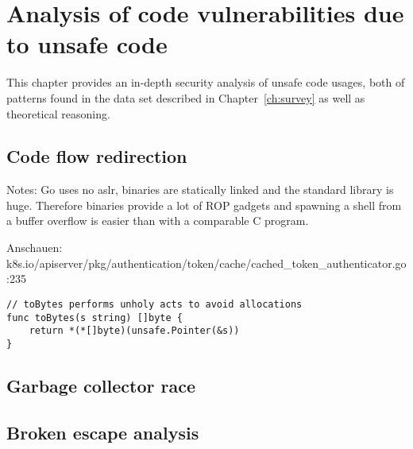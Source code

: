 
\chapter{Analysis of code vulnerabilities due to unsafe code}\label{ch:code-vulnerabilities}

This chapter provides an in-depth security analysis of unsafe code usages, both of patterns found in the data set
described in Chapter~\ref{ch:survey} as well as theoretical reasoning.



\section{Code flow redirection}\label{sec:vulnerability-flow-redirection}

Notes: Go uses no \acrshort{aslr}, binaries are statically linked and the standard library is huge.
Therefore binaries provide a lot of ROP gadgets and spawning a shell from a buffer overflow is easier than with a
comparable C program.

Anschauen: k8s.io/apiserver/pkg/authentication/token/cache/cached\_token\_authenticator.go:235

\begin{lstlisting}[language=Golang, label=lst:todo-unsafe-snippet, caption=Todo: unsafe code snippet?]
// toBytes performs unholy acts to avoid allocations
func toBytes(s string) []byte {
    return *(*[]byte)(unsafe.Pointer(&s))
}
\end{lstlisting}



\section{Garbage collector race}\label{sec:vulnerability-gc-race}



\section{Broken escape analysis}\label{sec:vulnerability-escape-analysis}

